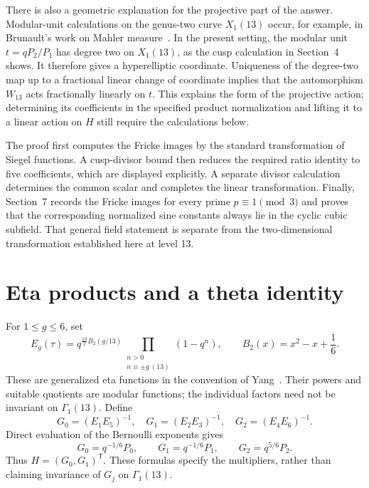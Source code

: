 \documentclass[11pt]{amsart}
\theoremstyle{remark}
\begin{document}
There is also a geometric explanation for the projective part of the
answer. Modular-unit calculations on the genus-two curve $X_1(13)$ occur,
for example, in Brunault's work on Mahler measure~\cite{Brunault}. In the
present setting, the modular unit $t=qP_2/P_1$ has degree two on
$X_1(13)$, as the cusp calculation in Section~4 shows. It therefore gives a
hyperelliptic coordinate. Uniqueness
of the degree-two map up to a fractional linear change of coordinate implies
that the automorphism $W_{13}$ acts fractionally linearly on $t$. This
explains the form of the projective action; determining its coefficients in
the specified product normalization and lifting it to a linear action on
$H$ still require the calculations below.

The proof first computes the Fricke images by the standard transformation
of Siegel functions. A cusp-divisor bound then reduces the required ratio
identity to five coefficients, which are displayed explicitly. A separate
divisor calculation determines the common scalar and completes the linear
transformation. Finally, Section~7 records the Fricke images for every prime
$p\equiv1\pmod3$ and proves that the corresponding normalized sine constants
always lie in the cyclic cubic subfield. That general field statement is
separate from the two-dimensional transformation established here at level
13.

\section{Eta products and a theta identity}
For $1\le g\le6$, set
\begin{equation}\label{eq:eta}
 E_g(\tau)=q^{\frac{13}{2}B_2(g/13)}
 \prod_{\substack{n>0\\n\equiv\pm g\ (13)}}(1-q^n),
 \qquad B_2(x)=x^2-x+\frac16.
\end{equation}
These are generalized eta functions in the convention of Yang~\cite{Yang04,Yang09}. Their powers and suitable quotients are modular functions; the individual factors need not be invariant on $\Gamma_1(13)$.
Define
\begin{equation}\label{eq:G}
 G_0=(E_1E_5)^{-1},\quad G_1=(E_2E_3)^{-1},\quad G_2=(E_4E_6)^{-1}.
\end{equation}
Direct evaluation of the Bernoulli exponents gives
\begin{equation}\label{eq:normalization}
 G_0=q^{-1/6}P_0,\qquad G_1=q^{-1/6}P_1,\qquad G_2=q^{5/6}P_2.
\end{equation}
Thus $H=(G_0,G_1)^{\mathsf T}$. These formulas specify the multipliers, rather than claiming invariance of $G_j$ on $\Gamma_1(13)$.
\end{document}
